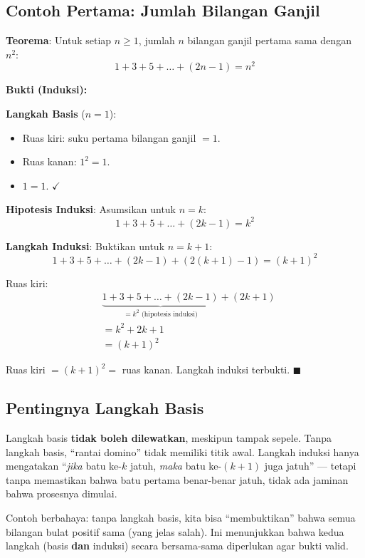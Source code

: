 \subsection{Contoh Pertama: Jumlah Bilangan Ganjil}

\begin{contoh}
\textbf{Teorema}: Untuk setiap $n \geq 1$, jumlah $n$ bilangan ganjil pertama sama dengan $n^2$:
\[ 1 + 3 + 5 + \ldots + (2n - 1) = n^2 \]

\textbf{Bukti (Induksi):}

\textbf{Langkah Basis} ($n = 1$):
\begin{itemize}
    \item Ruas kiri: suku pertama bilangan ganjil $= 1$.
    \item Ruas kanan: $1^2 = 1$.
    \item $1 = 1$. $\checkmark$
\end{itemize}

\textbf{Hipotesis Induksi}: Asumsikan untuk $n = k$:
\[ 1 + 3 + 5 + \ldots + (2k - 1) = k^2 \]

\textbf{Langkah Induksi}: Buktikan untuk $n = k + 1$:
\[ 1 + 3 + 5 + \ldots + (2k - 1) + (2(k+1) - 1) = (k+1)^2 \]

Ruas kiri:
\begin{align*}
&\underbrace{1 + 3 + 5 + \ldots + (2k - 1)}_{= k^2 \text{ (hipotesis induksi)}} + (2k + 1) \\
&= k^2 + 2k + 1 \\
&= (k + 1)^2
\end{align*}

Ruas kiri $= (k+1)^2 =$ ruas kanan. Langkah induksi terbukti. $\blacksquare$
\end{contoh}

\subsection{Pentingnya Langkah Basis}

\begin{catatan}
Langkah basis \textbf{tidak boleh dilewatkan}, meskipun tampak sepele. Tanpa langkah basis, ``rantai domino'' tidak memiliki titik awal. Langkah induksi hanya mengatakan ``\textit{jika} batu ke-$k$ jatuh, \textit{maka} batu ke-$(k+1)$ juga jatuh'' --- tetapi tanpa memastikan bahwa batu pertama benar-benar jatuh, tidak ada jaminan bahwa prosesnya dimulai.

Contoh berbahaya: tanpa langkah basis, kita bisa ``membuktikan'' bahwa semua bilangan bulat positif sama (yang jelas salah). Ini menunjukkan bahwa kedua langkah (basis \textbf{dan} induksi) secara bersama-sama diperlukan agar bukti valid.
\end{catatan}
